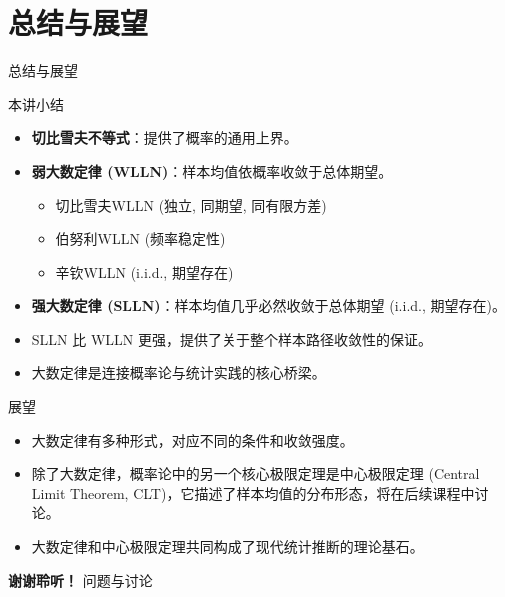 \documentclass[UTF8]{beamer} %
\begin{document}
\section{总结与展望}
\begin{frame}[shrink=5]{总结与展望}
    \begin{block}{本讲小结}
        \begin{itemize}
            \item \textbf{切比雪夫不等式}：提供了概率的通用上界。
            \item \textbf{弱大数定律 (WLLN)}：样本均值依概率收敛于总体期望。
                \begin{itemize}
                    \item 切比雪夫WLLN (独立, 同期望, 同有限方差)
                    \item 伯努利WLLN (频率稳定性)
                    \item 辛钦WLLN (i.i.d., 期望存在)
                \end{itemize}
            \item \textbf{强大数定律 (SLLN)}：样本均值几乎必然收敛于总体期望 (i.i.d., 期望存在)。
            \item SLLN 比 WLLN \alert{更强}，提供了关于整个样本路径收敛性的保证。
            \item 大数定律是连接概率论与统计实践的\alert{核心桥梁}。
        \end{itemize}
    \end{block}
    \pause
    \begin{alertblock}{展望}
        \begin{itemize}
            \item 大数定律有多种形式，对应不同的条件和收敛强度。
            \item 除了大数定律，概率论中的另一个核心极限定理是\alert{中心极限定理 (Central Limit Theorem, CLT)}，它描述了样本均值的分布形态，将在后续课程中讨论。
            \item 大数定律和中心极限定理共同构成了现代统计推断的理论基石。
        \end{itemize}
    \end{alertblock}
\end{frame}

\begin{frame}
    \centering
    \Huge{\bfseries 谢谢聆听！}
    \vspace{1cm}
    \normalsize
    问题与讨论
\end{frame}
\end{document}
